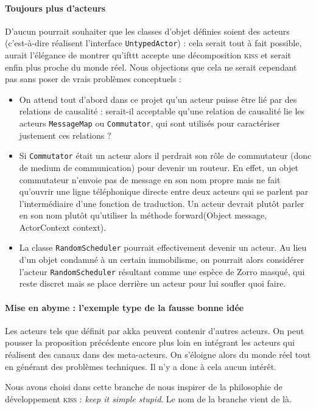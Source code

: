 \documentclass[11pt]{article}
\begin{document}
\paragraph{Toujours plus d'acteurs} D'aucun pourrait souhaiter que les classes d'objet définies soient des acteurs (c'est-à-dire réalisent l'interface \texttt{UntypedActor}) : cela serait tout à fait possible, aurait l'élégance de montrer qu'ifttt accepte une décomposition \textsc{kiss} et serait enfin plus proche du monde réel. Nous objections que cela ne serait cependant pas sans poser de vrais problèmes conceptuels :
\begin{itemize}
\item On attend tout d'abord dans ce projet qu'un acteur puisse être lié par des relations de causalité : serait-il acceptable qu'une relation de causalité lie les acteurs \texttt{MessageMap} ou \texttt{Commutator}, qui sont utilisés pour caractériser justement ces relations ?
\item Si \texttt{Commutator} était un acteur alors il perdrait son rôle de commutateur (donc de medium de communication) pour devenir un routeur. En effet, un objet commutateur n'envoie pas de message en son nom propre mais ne fait qu'ouvrir une ligne téléphonique directe entre deux acteurs qui se parlent par l'intermédiaire d'une fonction de traduction. Un acteur devrait plutôt parler en son nom plutôt qu'utiliser la méthode forward(Object message, ActorContext context).
\item La classe \texttt{RandomScheduler} pourrait effectivement devenir un acteur. Au lieu d'un objet condamné à un certain immobilisme, on pourrait alors considérer l'acteur \texttt{RandomScheduler} résultant comme une espèce de Zorro masqué, qui reste discret mais se place derrière un acteur pour lui soufler quoi faire.
\end{itemize}

\paragraph{Mise en abyme : l'exemple type de la fausse bonne idée} Les acteurs tels que définit par akka peuvent contenir d'autres acteurs. On peut pousser la proposition précédente encore plus loin en intégrant les acteurs qui réalisent des canaux dans des meta-acteurs. On s'éloigne alors du monde réel tout en générant des problèmes techniques. Il n'y a donc à cela aucun intérêt.

Nous avons choisi dans cette branche de nous inspirer de la \og philosophie de développement \fg{} \textsc{kiss} : \textsl{keep it simple stupid}. Le nom de la branche vient de là.
\end{document}
